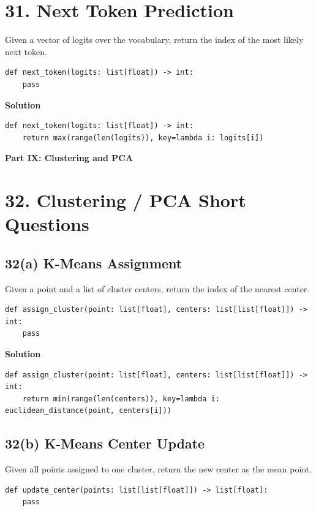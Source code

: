 \documentclass[11pt]{article}
\begin{document}
\section*{31. Next Token Prediction}
Given a vector of logits over the vocabulary, return the index of the most likely next token.

\begin{lstlisting}
def next_token(logits: list[float]) -> int:
    pass
\end{lstlisting}

\medskip
\noindent\textbf{Solution}
\begin{lstlisting}
def next_token(logits: list[float]) -> int:
    return max(range(len(logits)), key=lambda i: logits[i])
\end{lstlisting}

\vspace{0.75em}
\noindent\textbf{\large Part IX: Clustering and PCA}
\vspace{0.5em}

\section*{32. Clustering / PCA Short Questions}

\subsection*{32(a) K-Means Assignment}
Given a point and a list of cluster centers, return the index of the nearest center.

\begin{lstlisting}
def assign_cluster(point: list[float], centers: list[list[float]]) -> int:
    pass
\end{lstlisting}

\medskip
\noindent\textbf{Solution}
\begin{lstlisting}
def assign_cluster(point: list[float], centers: list[list[float]]) -> int:
    return min(range(len(centers)), key=lambda i: euclidean_distance(point, centers[i]))
\end{lstlisting}

\subsection*{32(b) K-Means Center Update}
Given all points assigned to one cluster, return the new center as the mean point.

\begin{lstlisting}
def update_center(points: list[list[float]]) -> list[float]:
    pass
\end{lstlisting}
\end{document}

